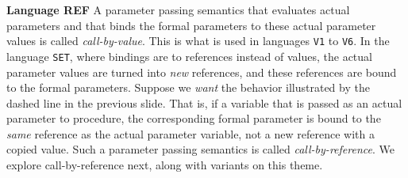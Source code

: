 \begin{minipage}[t]{\sw}
\slidenumber
\LARGE
{\bf Language REF}\exx
A parameter passing semantics that evaluates actual parameters
and that binds the formal parameters
to these actual parameter values
is called {\em call-by-value}.
This is what is used in languages \verb'V1' to \verb'V6'.
In the language \verb'SET',
where bindings are to references instead of values,
the actual parameter values are turned
into {\em new} references,
and these references are bound to the formal parameters.\exx
Suppose we {\em want} the behavior illustrated
by the dashed line in the previous slide.
That is, if a variable that is passed
as an actual parameter to procedure,
the corresponding formal parameter is bound
to the {\em same} reference as the actual parameter variable,
not a new reference with a copied value.\exx
Such a parameter passing semantics is called
{\em call-by-reference}.
We explore call-by-reference next,
along with variants on this theme.
\end{minipage}
